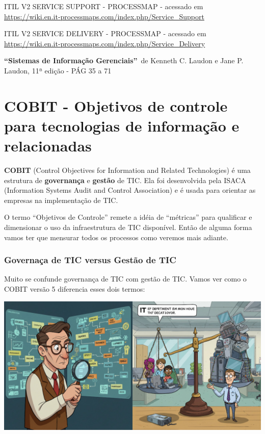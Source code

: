 \documentclass[
]{book}
\begin{document}
ITIL V2 SERVICE SUPPORT - PROCESSMAP - acessado em \url{https://wiki.en.it-processmaps.com/index.php/Service_Support}

ITIL V2 SERVICE DELIVERY - PROCESSMAP - acessado em \url{https://wiki.en.it-processmaps.com/index.php/Service_Delivery}

\textbf{``Sistemas de Informação Gerenciais''}~de Kenneth C. Laudon e Jane P. Laudon, 11ª edição - PÁG 35 a 71

\chapter{COBIT - Objetivos de controle para tecnologias de informação e relacionadas}\label{cobit---objetivos-de-controle-para-tecnologias-de-informauxe7uxe3o-e-relacionadas}

\textbf{COBIT} (Control Objectives for Information and Related Technologies) é uma estrutura de \textbf{governança} e \textbf{gestão} de TIC. Ela foi desenvolvida pela ISACA (Information Systems Audit and Control Association) e é usada para orientar as empresas na implementação de TIC.

O termo ``Objetivos de Controle'' remete a idéia de ``métricas'' para qualificar e dimensionar o uso da infraestrutura de TIC disponível. Então de alguma forma vamos ter que mensurar todos os processos como veremos mais adiante.

\subsection{Governaça de TIC versus Gestão de TIC}\label{governauxe7a-de-tic-versus-gestuxe3o-de-tic}

Muito se confunde governança de TIC com gestão de TIC. Vamos ver como o COBIT versão 5 diferencia esses dois termos:

\includegraphics[width=7.80208in,height=\textheight]{images/cobit/01-02-governanca-vs-gestao.jpg}
\end{document}
